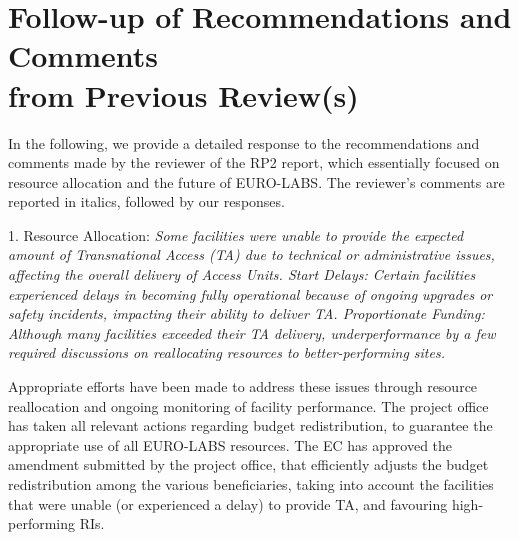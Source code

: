 
\section[Follow-up of Recommendations and Comments from Previous Review(s)]{\texorpdfstring{Follow-up of Recommendations and Comments\\from Previous Review(s)}{Follow-up of Recommendations and Comments from Previous Review(s)}}
\label{sec:follow-up-reviews}



{
In the following, we provide a detailed response to the recommendations and comments made by the reviewer of the RP2 report, which essentially focused on resource allocation and the future of EURO-LABS. The reviewer’s comments are reported in italics, followed by our responses.}



{1. Resource Allocation:
{\it Some facilities were unable to provide the expected amount of Transnational Access (TA) due to
technical or administrative issues, affecting the overall delivery of Access Units.
Start Delays: Certain facilities experienced delays in becoming fully operational because of ongoing upgrades or safety
incidents, impacting their ability to deliver TA.
Proportionate Funding: Although many facilities exceeded their TA delivery, underperformance by a few required
discussions on reallocating resources to better-performing sites.}}

{Appropriate efforts have been made to address these issues through resource reallocation and ongoing monitoring of
facility performance.
The project office has taken all relevant actions regarding budget redistribution, to guarantee the appropriate use of all EURO-LABS resources.
The EC has approved the amendment submitted by the project office, that efficiently adjusts the budget redistribution among the various beneficiaries, taking into account the facilities that were unable (or experienced a delay) to provide TA, and favouring high-performing RIs.
}


